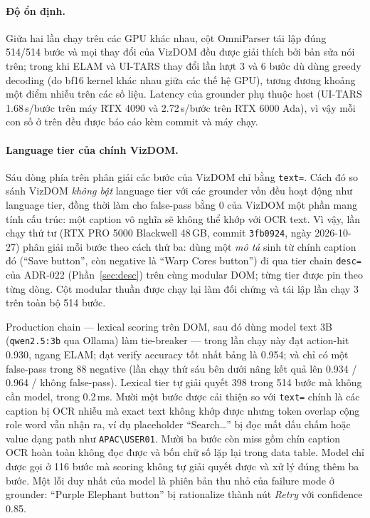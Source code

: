 \documentclass[11pt,a4paper]{article}
\newcommand{\code}[1]{\texttt{#1}}
\begin{document}
\paragraph{Độ ổn định.} Giữa hai lần chạy trên các GPU khác nhau, cột OmniParser tái
lập đúng 514/514 bước và mọi thay đổi của VizDOM đều được giải thích bởi bản sửa nói
trên; trong khi ELAM và UI-TARS thay đổi lần lượt 3 và 6 bước dù dùng greedy decoding
(do bf16 kernel khác nhau giữa các thế hệ GPU), tương đương khoảng một điểm nhiễu trên
các số liệu. Latency của grounder phụ thuộc host (UI-TARS 1.68\,s/bước trên máy RTX
4090 và 2.72\,s/bước trên RTX 6000 Ada), vì vậy mỗi con số ở trên đều được báo cáo kèm
commit và máy chạy.

\paragraph{Language tier của chính VizDOM.} Sáu dòng phía trên phân giải các bước của
VizDOM chỉ bằng \code{text=}. Cách đó so sánh VizDOM \emph{không bật} language tier với
các grounder vốn đều hoạt động như language tier, đồng thời làm cho false-pass bằng 0
của VizDOM một phần mang tính cấu trúc: một caption vô nghĩa sẽ không thể khớp với OCR
text. Vì vậy, lần chạy thứ tư (RTX PRO 5000 Blackwell 48\,GB, commit \code{3fb0924},
ngày 2026-10-27) phân giải mỗi bước theo cách thứ ba: dùng một \emph{mô tả} sinh từ
chính caption đó (``Save button'', còn negative là ``Warp Cores button'') đi qua tier
chain \code{desc=} của ADR-022 (Phần~\ref{sec:desc}) trên cùng modular DOM; từng tier
được pin theo từng dòng. Cột modular thuần được chạy lại làm đối chứng và tái lập lần
chạy 3 trên toàn bộ 514 bước.

Production chain --- lexical scoring trên DOM, sau đó dùng model text 3B
(\code{qwen2.5:3b} qua Ollama) làm tie-breaker --- trong lần chạy này đạt action-hit
0.930, ngang ELAM; đạt verify accuracy tốt nhất bảng là 0.954; và chỉ có một
false-pass trong 88 negative (lần chạy thứ sáu bên dưới nâng kết quả lên
0.934 / 0.964 / không false-pass).
Lexical tier tự giải quyết 398 trong 514 bước mà không cần model, trong 0.2\,ms. Mười
một bước được cải thiện so với \code{text=} chính là các caption bị OCR nhiễu mà exact
text không khớp được nhưng token overlap cộng role word vẫn nhận ra, ví dụ placeholder
``Search\ldots'' bị đọc mất dấu chấm hoặc value dạng path như
\code{APAC\textbackslash USER01}. Mười ba bước còn miss gồm chín caption OCR hoàn toàn
không đọc được và bốn chữ số lặp lại trong data table. Model chỉ được gọi ở 116 bước mà
scoring không tự giải quyết được và xử lý đúng thêm ba bước. Một lỗi duy nhất của model
là phiên bản thu nhỏ của failure mode ở grounder: ``Purple Elephant button'' bị
rationalize thành nút \emph{Retry} với confidence 0.85.
\end{document}
